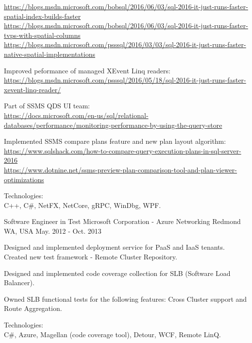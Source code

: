 \begin{cventries}
{\begin{cvitems}
{      \scriptsize
      \url{https://blogs.msdn.microsoft.com/bobsql/2016/06/03/sql-2016-it-just-runs-faster-spatial-index-builds-faster} \\
      \url{https://blogs.msdn.microsoft.com/bobsql/2016/06/03/sql-2016-it-just-runs-faster-tvps-with-spatial-columns} \\
      \url{https://blogs.msdn.microsoft.com/psssql/2016/03/03/sql-2016-it-just-runs-faster-native-spatial-implementations}
      }
    \item
    {
      Improved peformance of managed XEvent Linq readers: \\
      \scriptsize
      \url {https://blogs.msdn.microsoft.com/psssql/2016/05/18/sql-2016-it-just-runs-faster-xevent-linq-reader/}
    }
    \item
    { 
      Part of SSMS QDS UI team: \\
      \scriptsize
      \url {https://docs.microsoft.com/en-us/sql/relational-databases/performance/monitoring-performance-by-using-the-query-store}
    }
    \item
    {
      Implemented SSMS compare plans feature and new plan layout algorithm: \\
      \scriptsize
      \url {https://www.sqlshack.com/how-to-compare-query-execution-plans-in-sql-server-2016} \\
      \url {https://www.dotnine.net/ssms-preview-plan-comparison-tool-and-plan-viewer-optimizations}
    }
    \item
    {
      Technologies: \\
      C++, {C\#}, NetFX, NetCore, gRPC, WinDbg, WPF. \\
    }
  \end{cvitems}
}

\cventry
{Software Engineer in Test} %
{Microsoft Corporation - Azure Networking} %
{Redmond WA, USA} %
{May. 2012 - Oct. 2013} %
{
  \begin{cvitems} %
    \item
    {
      Designed and implemented deployment service for PaaS and IaaS tenants. 
      Created new test framework - Remote Cluster Repository.
    }
    \item
    {
      Designed and implemented code coverage collection for SLB (Software Load Balancer).
    }
    \item
    {
      Owned SLB functional tests for the following features:
      Cross Cluster support and Route Aggregation.
    }
    \item
    {
      Technologies: \\
      {C\#}, Azure, Magellan (code coverage tool), Detour, WCF, Remote LinQ.
    }
  \end{cvitems}
}


\end{cventries}
